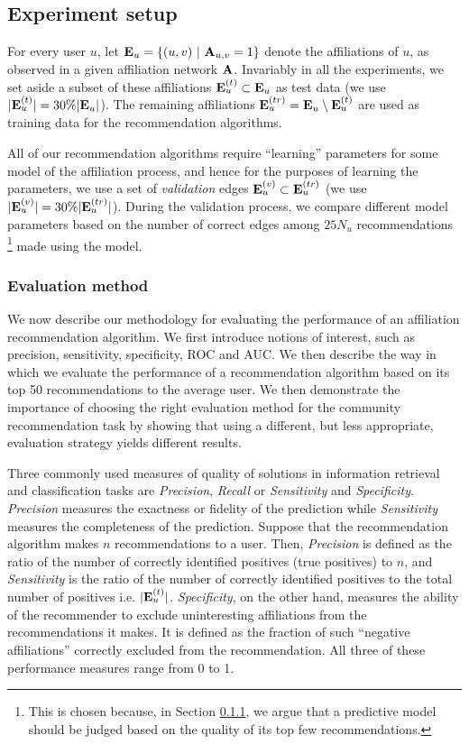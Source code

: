 \subsection{Experiment setup}
For every user $u$, let $\mathbf{E}_u = \left\{ (u,v) \ | \ \mathbf{A}_{u,v} = 1 \right\}$ denote the affiliations of $u$, as observed in a given affiliation network $\mathbf{A}$. Invariably in all the experiments, we set aside a subset of these affiliations $\mathbf{E}_{u}^{(t)} \subset \mathbf{E}_u$ as test data (we use $|\mathbf{E}_u^{(t)}| = 30 \% |\mathbf{E}_u|$). The remaining affiliations $\mathbf{E}_u^{(tr)} = \mathbf{E}_u \setminus \mathbf{E}_u^{(t)}$ are used as training data for the recommendation algorithms.

All of our recommendation algorithms require ``learning'' parameters for some model of the affiliation process, and hence for the purposes of learning the parameters, we use a set of \textit{validation} edges $\mathbf{E}_u^{(v)} \subset \mathbf{E}_u^{(tr)}$ (we use $|\mathbf{E}_u^{(v)}| = 30 \% |\mathbf{E}_u^{(tr)}|$). During the validation process, we compare different model parameters based on the number of correct edges among $25 N_u$ recommendations \footnote{This is chosen because, in Section \ref{Evaluation method}, we argue that a predictive model should be judged based on the quality of its top few recommendations.} made using the model.

\subsubsection{Evaluation method}
\label{Evaluation method}
We now describe our methodology for evaluating the performance of an affiliation recommendation algorithm. We first introduce notions of interest, such as precision, sensitivity, specificity, ROC and AUC. We then describe the way in which we evaluate the performance of a recommendation algorithm based on its top 50 recommendations to the average user. We then demonstrate the importance of choosing the right evaluation method for the community recommendation task by showing that using a different, but less appropriate, evaluation strategy yields different results.

Three commonly used measures of quality of solutions in information retrieval and classification tasks are \textit{Precision}, \textit{Recall} or \textit{Sensitivity} and \textit{Specificity}. \textit{Precision} measures the exactness or fidelity of the prediction while \textit{Sensitivity} measures the completeness of the prediction. Suppose that the recommendation algorithm makes $n$ recommendations to a user. Then, \textit{Precision} is defined as the ratio of the number of correctly identified positives (true positives) to $n$, and \textit{Sensitivity} is the ratio of the number of correctly identified positives to the total number of positives i.e. $|\mathbf{E}_u^{(t)}|$. \textit{Specificity}, on the other hand, measures the ability of the recommender to exclude uninteresting affiliations from the recommendations it makes. It is defined as the fraction of such ``negative affiliations'' correctly excluded from the recommendation. All three of these performance measures range from 0 to 1.

